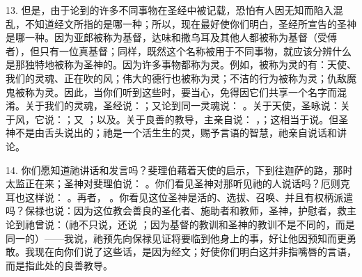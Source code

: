 13. 但是，由于论到的许多不同事物在圣经中被记载，恐怕有人因无知而陷入混乱，不知道经文所指的是哪一种；所以，现在最好使你们明白，圣经所宣告的圣神是哪一种。因为亚郎被称为基督，达味和撒乌耳及其他人都被称为基督（受傅者），但只有一位真基督；同样，既然这个名称被用于不同事物，就应该分辨什么是那独特地被称为圣神的。因为许多事物都称为灵。例如，被称为灵的有：天使、我们的灵魂、正在吹的风；伟大的德行也被称为灵；不洁的行为被称为灵；仇敌魔鬼被称为灵。因此，当你们听到这些时，要当心，免得因它们共享一个名字而混淆。关于我们的灵魂，圣经说：；又论到同一灵魂说： 。关于天使，圣咏说：关于风，它说：；又 ；以及。关于良善的教导，主亲自说： ，；这相当于说。但圣神不是由舌头说出的；祂是一个活生生的灵，赐予言语的智慧，祂亲自说话和讲论。\par

14. 你们愿知道祂讲话和发言吗？斐理伯藉着天使的启示，下到往迦萨的路，那时太监正在来；圣神对斐理伯说： 。你们看见圣神对那听见祂的人说话吗？厄则克耳也这样说： 。再者， 。你看见这位圣神是活的、选拔、召唤、并且有权柄派遣吗？保禄也说：因为这位教会善良的圣化者、施助者和教师，圣神，护慰者，救主论到祂曾说：（祂不只说，还说 ；因为基督的教训和圣神的教训不是不同的，而是同一的）——我说，祂预先向保禄见证将要临到他身上的事，好让他因预知而更勇敢。我现在向你们说了这些话，是因为经文；好使你们明白这并非指嘴唇的言语，而是指此处的良善教导。\par

